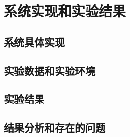 
\chapter{系统实现和实验结果}
\label{chap:experiment}

\section{系统具体实现}
\label{sec:implementation}

\section{实验数据和实验环境}
\label{sec:dataenv}

\section{实验结果}
\label{sec:results}

\section{结果分析和存在的问题}
\label{sec:analysis}


